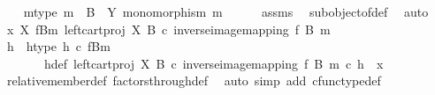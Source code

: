 \begin{isabellebody}
%
\isadelimproof
%
\endisadelimproof
%
\isatagproof
{}\isamarkupfalse%
\isanewline
\ \ \isamarkupfalse%
\ m{\isacharunderscore}{\kern0pt}type{\isacharcolon}{\kern0pt}\ {\isachardoublequoteopen}m\ {\isacharcolon}{\kern0pt}\ B\ {\isasymrightarrow}\ Y{\isachardoublequoteclose}\ {\isachardoublequoteopen}monomorphism\ m{\isachardoublequoteclose}\isanewline
\ \ \ \ \isamarkupfalse%
\ assms{\isacharparenleft}{\kern0pt}{}{\isacharparenright}{\kern0pt}\ \isamarkupfalse%
\ subobject{\isacharunderscore}{\kern0pt}of{\isacharunderscore}{\kern0pt}def{}\ \isamarkupfalse%
\ auto\isanewline
\isanewline
\ \ \isamarkupfalse%
\ {\isachardoublequoteopen}x\ {\isasymin}\isactrlbsub X\isactrlesub \ {\isacharparenleft}{\kern0pt}f\isactrlsup {\isacharminus}{\kern0pt}B{\isasymrparr}\isactrlbsub m\isactrlesub {\isacharcomma}{\kern0pt}\ left{\isacharunderscore}{\kern0pt}cart{\isacharunderscore}{\kern0pt}proj\ X\ B\ {\isasymcirc}\isactrlsub c\ inverse{\isacharunderscore}{\kern0pt}image{\isacharunderscore}{\kern0pt}mapping\ f\ B\ m{\isacharparenright}{\kern0pt}{\isachardoublequoteclose}\isanewline
\ \ \isamarkupfalse%
\ \isamarkupfalse%
\ h\ \ h{\isacharunderscore}{\kern0pt}type{\isacharcolon}{\kern0pt}\ {\isachardoublequoteopen}h\ {\isasymin}\isactrlsub c\ {\isacharparenleft}{\kern0pt}f\isactrlsup {\isacharminus}{\kern0pt}B{\isasymrparr}\isactrlbsub m\isactrlesub {\isacharparenright}{\kern0pt}{\isachardoublequoteclose}\isanewline
\ \ \ \ \ \ \ h{\isacharunderscore}{\kern0pt}def{\isacharcolon}{\kern0pt}\ {\isachardoublequoteopen}{\isacharparenleft}{\kern0pt}left{\isacharunderscore}{\kern0pt}cart{\isacharunderscore}{\kern0pt}proj\ X\ B\ {\isasymcirc}\isactrlsub c\ inverse{\isacharunderscore}{\kern0pt}image{\isacharunderscore}{\kern0pt}mapping\ f\ B\ m{\isacharparenright}{\kern0pt}\ {\isasymcirc}\isactrlsub c\ h\ {\isacharequal}{\kern0pt}\ x{\isachardoublequoteclose}\isanewline
\ \ \ \ \isamarkupfalse%
\ relative{\isacharunderscore}{\kern0pt}member{\isacharunderscore}{\kern0pt}def{}\ factors{\isacharunderscore}{\kern0pt}through{\isacharunderscore}{\kern0pt}def\ \isamarkupfalse%
\ {\isacharparenleft}{\kern0pt}auto\ simp\ add{\isacharcolon}{\kern0pt}\ cfunc{\isacharunderscore}{\kern0pt}type{\isacharunderscore}{\kern0pt}def{\isacharparenright}{\kern0pt}\isanewline
\ \ \isamarkupfalse%

\end{isabellebody}
